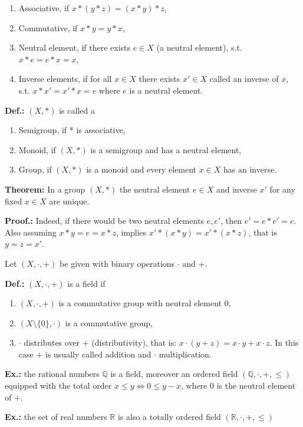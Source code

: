 \documentclass{article}
\begin{document}
\begin{enumerate}
    \item Associative, if $x * (y * z) = (x * y) * z$,
    \item Commutative, if $x * y = y * x$,
    \item Neutral element, if there exists $e\in X$ (a neutral element), s.t. $x*e=e*x=x$,
    \item Inverse elements, if for all $x\in X$ there exists $x'\in X$ called an inverse of $x$, s.t. $x*x'=x'*x =e$ where $e$ is a neutral element.
\end{enumerate}

\textbf{Def.:} $(X, *)$ is called a
\begin{enumerate}
    \item Semigroup, if * is associative,
    \item Monoid, if $(X, *)$ is a semigroup and has a neutral element,
    \item Group, if $(X, *)$ is a monoid and every element $x\in X$ has an inverse.
\end{enumerate}

\textbf{Theorem:} In a group $(X, *)$ the neutral element $e\in X$ and inverse $x'$ for any fixed $x\in X$ are unique.

\textbf{Proof.:} Indeed, if there would be two neutral elements $e, e'$, then $e'=e*e'=e$. Also assuming $x*y=e=x*z$, implies $x'*(x*y)=x'*(x*z)$, that is $y=z=x'$.

Let $(X, \cdot, +)$ be given with binary operations $\cdot$ and $+$.

\textbf{Def.:} $(X, \cdot, +)$ is a field if
\begin{enumerate}
    \item $(X, \cdot, +)$ is a commutative group with neutral element 0,
    \item $(X\setminus \{0\}, \cdot)$ is a commutative group,
    \item $\cdot$ distributes over $+$ (distributivity), that is: $x\cdot (y+z) = x\cdot y + x\cdot z$.
In this case $+$ is usually called addition and $\cdot$ multiplication.
\end{enumerate}

\textbf{Ex.:} the rational numbers $\mathbb{Q}$ is a field, moreover an ordered field $(\mathbb{Q}, \cdot, +, \leq)$ equipped with the total order $x\leq y\iff0\leq y-x$, where 0 is the neutral element of $+$.

\textbf{Ex.:} the set of real numbers $\mathbb{R}$ is also a totally ordered field $(\mathbb{R}, \cdot, +, \leq)$
\end{document}
